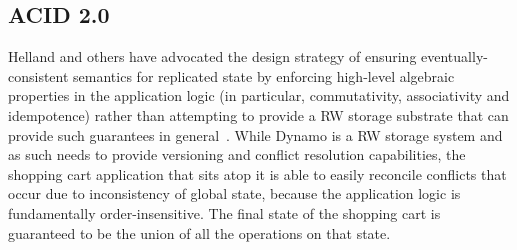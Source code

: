 \subsection{ACID 2.0}

Helland and others have advocated the design strategy of ensuring eventually-consistent 
semantics for replicated state by enforcing high-level algebraic 
properties in the application logic (in particular, commutativity, associativity and 
idempotence) rather than attempting to provide a RW storage substrate that can provide
such guarantees in general~\cite{quicksand, beyond}.  While Dynamo is a RW storage system
and as such needs to provide versioning and conflict resolution capabilities, the shopping
cart application that sits atop it is able to easily reconcile conflicts that occur due to inconsistency of global state, because the application logic is fundamentally order-insensitive.
The final state of the shopping cart is guaranteed to be the union of all the operations on
that state.
